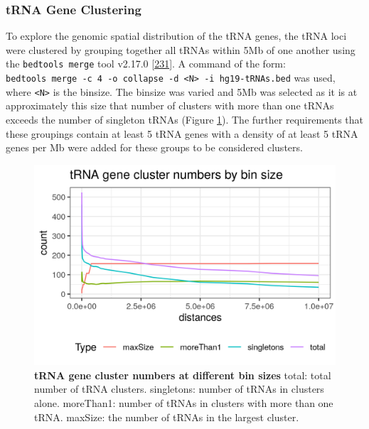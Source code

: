 \documentclass[
]{book}
\begin{document}
\hypertarget{clustering}{%
\subsubsection{tRNA Gene Clustering}\label{clustering}}

To explore the genomic spatial distribution of the tRNA genes, the tRNA loci were clustered by grouping together all tRNAs within 5Mb of one another using the \texttt{bedtools\ merge} tool v2.17.0 {[}\protect\hyperlink{ref-Quinlan2010}{231}{]}.
A command of the form: \texttt{bedtools\ merge\ -c\ 4\ -o\ collapse\ -d\ \textless{}N\textgreater{}\ -i\ hg19-tRNAs.bed} was used, where \texttt{\textless{}N\textgreater{}} is the binsize.
The binsize was varied and 5Mb was selected as it is at approximately this size that number of clusters with more than one tRNAs exceeds the number of singleton tRNAs (Figure \ref{fig:tRNAgeneClustersByBinSize}).
The further requirements that these groupings contain at least 5 tRNA genes with a density of at least 5 tRNA genes per Mb were added for these groups to be considered clusters.

\begin{figure}

{\centering \includegraphics[width=1\linewidth]{figs/tRNAgeneClustersByBinSize} 

}

\caption{\textbf{tRNA gene cluster numbers at different bin sizes} total: total number of tRNA clusters. singletons: number of tRNAs in clusters alone. moreThan1: number of tRNAs in clusters with more than one tRNA. maxSize: the number of tRNAs in the largest cluster.}\label{fig:tRNAgeneClustersByBinSize}
\end{figure}
\end{document}
